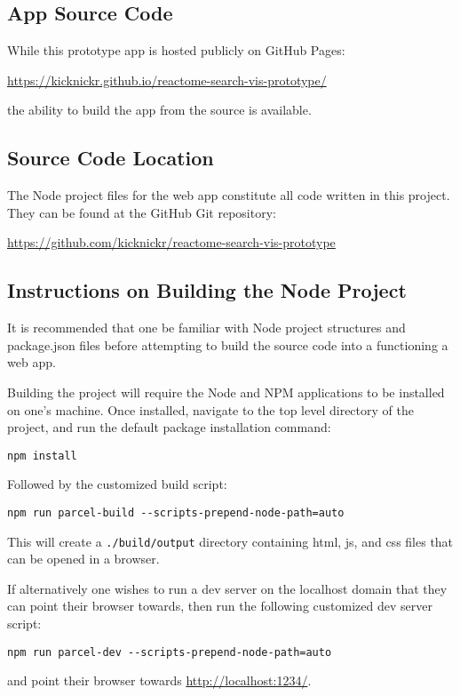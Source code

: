 \documentclass[12pt, letterpaper]{report}
\begin{document}
\begin{appendices}
	
%

\chapter{App Source Code}
\label{ch:App Source Code}
While this prototype app is hosted publicly on GitHub Pages:

\noindent\url{https://kicknickr.github.io/reactome-search-vis-prototype/}

\noindent the ability to build the app from the source is available.

\section {Source Code Location}
The Node project files for the web app constitute all code written in this project. They can be found at the GitHub Git repository:

\noindent\url{https://github.com/kicknickr/reactome-search-vis-prototype}
\section{Instructions on Building the Node Project}

It is recommended that one be familiar with Node project structures and package.json files before attempting to build the source code into a functioning a web app.

Building the project will require the Node and NPM applications to be installed on one's machine. Once installed, navigate to the top level directory of the project, and run the default package installation command:
\begin{verbatim}
npm install
\end{verbatim}
Followed by the customized build script:
\begin{verbatim}
npm run parcel-build --scripts-prepend-node-path=auto
\end{verbatim}
This will create a \verb|./build/output| directory containing html, js, and css files that can be opened in a browser. 

If alternatively one wishes to run a dev server on the localhost domain that they can point their browser towards, then run the following customized dev server script:
\begin{verbatim}
npm run parcel-dev --scripts-prepend-node-path=auto
\end{verbatim}
and point their browser towards \url{http://localhost:1234/}.


\end{appendices}
\end{document}
